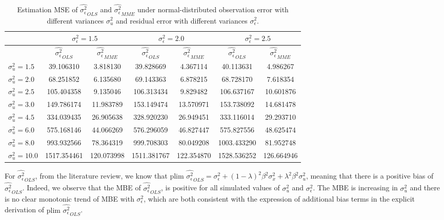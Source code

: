 \documentclass{article}
\begin{document}
\begin{table}[ht]
    \centering
    \caption{Estimation MSE of $\hat{\sigma^2_\epsilon}_{OLS}$ and $\hat{\sigma^2_\epsilon}_{MME}$ under normal-distributed observation error with different variances $\sigma^2_u$ and residual error with different variances $\sigma^2_\epsilon$.}
    \label{Tab:MSE_sigma_t}
    \begin{tabular}[t]{lcccccc}
        \hline
        &\multicolumn{2}{c}{$\sigma^2_\epsilon=1.5$}&\multicolumn{2}{c}{$\sigma^2_\epsilon=2.0$}&\multicolumn{2}{c}{$\sigma^2_\epsilon=2.5$}\\
        \hline
        &$\hat{\sigma^2_\epsilon}_{OLS}$&$\hat{\sigma^2_\epsilon}_{MME}$&$\hat{\sigma^2_\epsilon}_{OLS}$&
        $\hat{\sigma^2_\epsilon}_{MME}$&$\hat{\sigma^2_\epsilon}_{OLS}$&$\hat{\sigma^2_\epsilon}_{MME}$\\ 
        \hline
        $\sigma^2_u = 1.5$&39.106310&3.818130&39.828669&4.367114&40.113631&4.986267\\
        $\sigma^2_u = 2.0$&68.251852&6.135680&69.143363&6.878215&68.728170&7.618354\\
        $\sigma^2_u = 2.5$&105.404358&9.135046&106.313434&9.829482&106.637167&10.601876\\
        $\sigma^2_u = 3.0$&149.786174&11.983789&153.149474&13.570971&153.738092&14.681478\\
        $\sigma^2_u = 4.5$&334.039435&26.905638&328.920230&26.949451&333.116014&29.293710\\
        $\sigma^2_u = 6.0$&575.168146&44.066269&576.296059&46.827447&575.827556&48.625474\\
        $\sigma^2_u = 8.0$&993.932566&78.364319&999.708303&80.049208&1003.433290&81.952748\\
        $\sigma^2_u = 10.0$&1517.354461&120.073998&1511.381767&122.354870&1528.536252&126.664946\\
        \hline
    \end{tabular}
\end{table}

For $\hat{\sigma^2_\epsilon}_{OLS}$, from the literature review, we know that $\textrm{plim } \hat{\sigma^2_\epsilon}_{OLS} = \sigma_\epsilon^2 + (1-\lambda)^2 \beta^2 \sigma_x^2 + \lambda^2 \beta^2 \sigma_u^2$, meaning that there is a positive bias of $\hat{\sigma^2_\epsilon}_{OLS}$. 
Indeed, we observe that the MBE of $\hat{\sigma^2_\epsilon}_{OLS}$, is positive for all simulated values of $\sigma^2_u$ and $\sigma^2_\epsilon$.
The MBE is increasing in $\sigma^2_u$ and there is no clear monotonic trend of MBE with $\sigma^2_\epsilon$, which are both consistent with the expression of additional bias terms in the explicit derivation of $\textrm{plim } \hat{\sigma^2_\epsilon}_{OLS}$.
\end{document}
